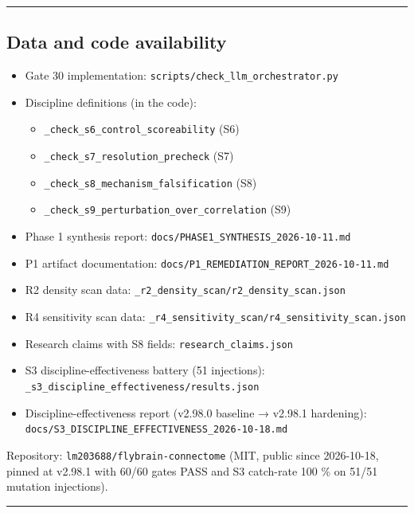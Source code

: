 \documentclass[
]{article}
\providecommand{\tightlist}{%
  \setlength{\itemsep}{0pt}\setlength{\parskip}{0pt}}
\begin{document}
\begin{center}\rule{0.5\linewidth}{0.5pt}\end{center}

\subsection{Data and code
availability}\label{data-and-code-availability}

\begin{itemize}
\tightlist
\item
  Gate 30 implementation: \texttt{scripts/check\_llm\_orchestrator.py}
\item
  Discipline definitions (in the code):

  \begin{itemize}
  \tightlist
  \item
    \texttt{\_check\_s6\_control\_scoreability} (S6)
  \item
    \texttt{\_check\_s7\_resolution\_precheck} (S7)
  \item
    \texttt{\_check\_s8\_mechanism\_falsification} (S8)
  \item
    \texttt{\_check\_s9\_perturbation\_over\_correlation} (S9)
  \end{itemize}
\item
  Phase 1 synthesis report:
  \texttt{docs/PHASE1\_SYNTHESIS\_2026-10-11.md}
\item
  P1 artifact documentation:
  \texttt{docs/P1\_REMEDIATION\_REPORT\_2026-10-11.md}
\item
  R2 density scan data:
  \texttt{\_r2\_density\_scan/r2\_density\_scan.json}
\item
  R4 sensitivity scan data:
  \texttt{\_r4\_sensitivity\_scan/r4\_sensitivity\_scan.json}
\item
  Research claims with S8 fields: \texttt{research\_claims.json}
\item
  S3 discipline-effectiveness battery (51 injections):
  \texttt{\_s3\_discipline\_effectiveness/results.json}
\item
  Discipline-effectiveness report (v2.98.0 baseline → v2.98.1
  hardening): \texttt{docs/S3\_DISCIPLINE\_EFFECTIVENESS\_2026-10-18.md}
\end{itemize}

Repository: \texttt{lm203688/flybrain-connectome} (MIT, public since
2026-10-18, pinned at v2.98.1 with 60/60 gates PASS and S3 catch-rate
100 \% on 51/51 mutation injections).

\begin{center}\rule{0.5\linewidth}{0.5pt}\end{center}
\end{document}

